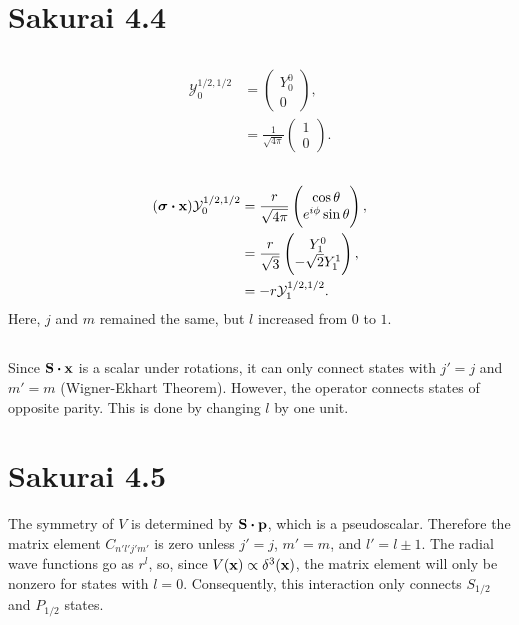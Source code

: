 \documentclass[
a4paper,
10pt,
twoside,
]{article}
\begin{document}
\titleinf
\maketitle
\startmcols

\section{Sakurai 4.4}
\subsection{}
\begin{align}
	\mathcal{Y}_{0}^{1/2,1/2} &= \begin{pmatrix}
		Y_0^0 \\ 0
	\end{pmatrix},\\
	&= \frac{1}{\sqrt{4\pi}} \begin{pmatrix}
		1 \\ 0
	\end{pmatrix}.
\end{align}
\subsection{}
\begin{align}
	(\bm{\sigma}\vdot\vb{x})\mathcal{Y}_{0}^{1/2,1/2} &= \frac{r}{\sqrt{4\pi}}\begin{pmatrix}
		\cos\theta \\ e^{i\phi}\sin\theta
	\end{pmatrix},\\
	&= \frac{r}{\sqrt{3}}\begin{pmatrix}
		Y_1^0 \\ -\sqrt{2}Y_1^1
	\end{pmatrix},\\
	&= -r \mathcal{Y}_{1}^{1/2,1/2}.
\end{align}
Here, $j$ and $m$ remained the same, but $l$ increased from $0$ to $1$.

\subsection{}
Since $\vb{S}\vdot\vb{x}$ is a scalar under rotations, it can only connect states with $j' = j$ and $m'=m$ (Wigner-Ekhart Theorem).
However, the operator connects states of opposite parity.
This is done by changing $l$ by one unit.

\section{Sakurai 4.5}
The symmetry of $V$ is determined by $\vb{S}\vdot\vb{p}$, which is a pseudoscalar.
Therefore the matrix element $C_{n'l'j'm'}$ is zero unless $j'=j$, $m'=m$, and $l'=l\pm 1$.
The radial wave functions go as $r^l$, so, since $V(\vb{x})\propto \delta^{3}(\vb{x})$, the matrix element will only be nonzero for states with $l=0$.
Consequently, this interaction only connects $S_{1/2}$ and $P_{1/2}$ states.
\end{document}
